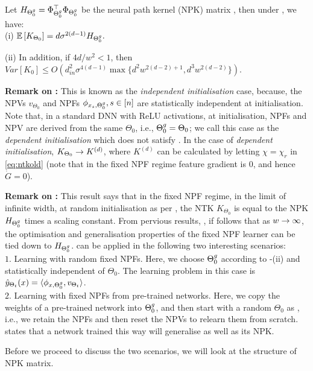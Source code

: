 \begin{theorem}\label{th:main} Let $H_{{\Theta}^g_0}=\Phi^\top_{{\Theta}^g_0}\Phi_{{\Theta}^g_0}$ be the neural path kernel (NPK) matrix , then under , we have:\\
(i) $\mathbb{E}\left[K_{\Theta_0}\right]=d\sigma^{2(d-1)} H_{{\Theta}^g_0}.$

(ii) In addition, if ${4d}/{w^2}<1$, then $Var\left[K_0\right]\leq O\left(d^2_{in}\sigma^{4(d-1)}\max\{d^2w^{2(d-2)+1}, d^3w^{2(d-2)}\}\right)$.
\end{theorem}
\textbf{Remark on :} This is known as the \emph{independent initialisation} case, because, the NPVs $v_{\Theta_0}$ and NPFs $\phi_{x_s,{\Theta}^g_0},s\in[n]$ are statistically independent at initialisation. Note that, in a standard DNN with ReLU activations, at initialisation, NPFs and NPV are derived from the same $\Theta_0$, i.e., ${\Theta}^g_0=\Theta_0$; we call this case as the \emph{dependent initialisation} which does not satisfy . In the case of \emph{dependent initialisation}, $K_{\Theta_0}\rightarrow K^{(d)}$, where $K^{(d)}$ can be calculated by letting $\chi=\chi_{r}$ in \eqref{eq:ntkold} (note that in the fixed NPF regime feature gradient is $0$, and hence $\dot{G}=0$).

\textbf{Remark on :} This result says that in the fixed NPF regime, in the limit of infinite width, at random initialisation as per , the NTK $K_{\Theta_0}$ is equal to the NPK $H_{{\Theta}^g_0}$ times a scaling constant. From pervious results, \cite{arora2019exact,cao2019generalization}, if follows that as $w\rightarrow\infty$, the optimisation and generalisation properties of the fixed NPF learner can be tied down to $H_{{\Theta}^g_0}$.  can be applied in the following two interesting scenarios:\\
$1.$ Learning with random fixed NPFs. Here, we choose ${\Theta}^g_0$ according to -(ii) and statistically independent of $\Theta_0$. The learning problem in this case is $\hat{y}_{\Theta_t}(x)=\langle \phi_{x,{\Theta}^g_0},v_{\Theta_t}\rangle$.\\
$2.$ Learning with fixed NPFs from pre-trained networks. Here, we copy the weights of a pre-trained network into ${\Theta}^g_0$, and then start with a random $\Theta_0$ as , i.e., we retain the NPFs and then reset the NPVs to relearn them from scratch.  states that a network trained this way will generalise as well as its NPK.

Before we proceed to discuss the two scenarios, we will look at the structure of NPK matrix.
